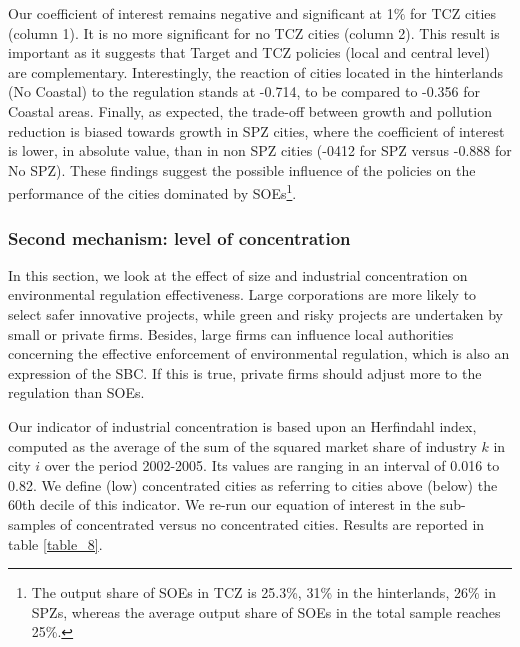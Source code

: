 \documentclass[12pt]{article}
\begin{document}
Our coefficient of interest remains negative and significant at 1$\%$ for TCZ cities (column 1). It is no more significant for no TCZ cities (column 2). This result is important as it suggests that Target and TCZ policies (local and central level) are complementary.  Interestingly, the reaction of cities located in the hinterlands (No Coastal) to the regulation stands at -0.714, to be compared to -0.356 for Coastal areas. Finally, as expected, the trade-off between growth and pollution reduction is biased towards growth in SPZ cities, where the coefficient of interest is lower, in absolute value, than in non SPZ cities (-0412 for SPZ versus -0.888 for No SPZ). These findings suggest the possible influence of the policies on the performance of the cities dominated by SOEs\footnote{The output share of SOEs in TCZ is 25.3\%, 31\% in the hinterlands, 26\% in SPZs, whereas the average output share of SOEs in the total sample reaches 25\%.}.


\subsubsection{Second mechanism: level of concentration} \label{concentration}





In this section, we look at the effect of size and industrial concentration on environmental regulation effectiveness. Large corporations are more likely to select safer innovative projects, while green and risky projects are undertaken by small or private firms. Besides, large firms can influence local authorities concerning the effective enforcement of environmental regulation, which is also an expression of the SBC. If this is true, private firms should adjust more to the regulation than SOEs. 


Our indicator of industrial concentration is based upon an Herfindahl index, computed as the average of the sum of the squared market share of industry $k$ in city $i$ over the period 2002-2005. Its values are ranging in an interval of 0.016 to 0.82. We define (low) concentrated cities as referring to cities above (below) the 60th decile of this indicator. We re-run our equation of interest in the sub-samples of concentrated versus no concentrated cities. Results are reported in table \ref{table_8}. 
\end{document}
